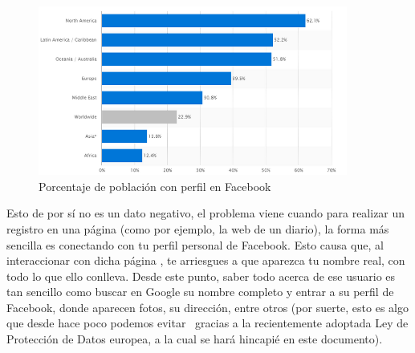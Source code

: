 \begin{figure}[h]
	\centerline{
		\mbox{\includegraphics[width=4.00in]{images/sn.png}}
	}
	\caption{Porcentaje de población con perfil en Facebook~\cite{article:FacebookStats} }
	\label{fig:norm_Daugman}
\end{figure}

Esto de por sí no es un dato negativo, el problema viene cuando para
realizar un registro en una página (como por ejemplo, la web de un
diario), la forma más sencilla es conectando con tu perfil personal de
Facebook. Esto causa que, al interaccionar con dicha página , te
arriesgues a que aparezca tu nombre real, con todo lo que ello
conlleva. Desde este punto, saber todo acerca de ese usuario es tan
sencillo como buscar en Google su nombre completo y entrar a su perfil
de Facebook, donde aparecen fotos, su dirección, entre otros (por
suerte, esto es algo que desde hace poco podemos
evitar~\cite{article:GDPRGoogle} gracias a la recientemente adoptada
Ley de Protección de Datos europea,  a la cual se hará hincapié en este
documento).

